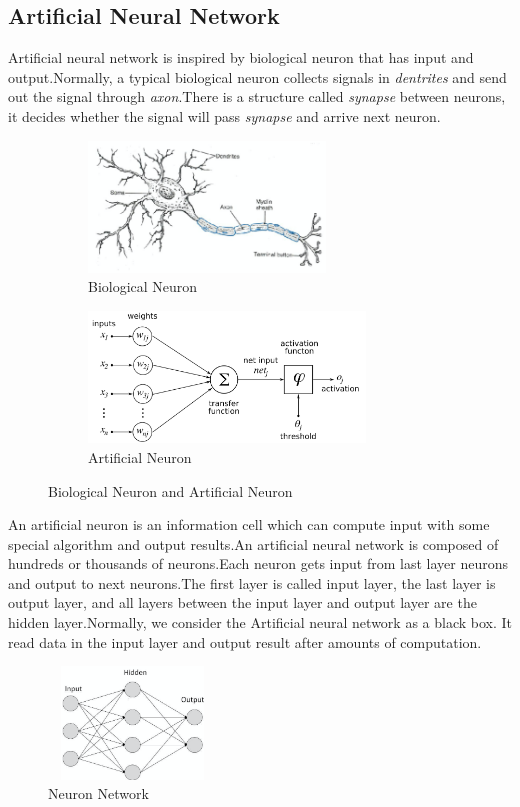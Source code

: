 \documentclass[12pt,a4paper]{report}
\begin{document}
\subsection{Artificial Neural Network}
Artificial neural network is inspired by biological neuron that has input and output.Normally, a typical biological neuron collects  signals in \textit{dentrites} and send out the signal through \textit{axon}.There is a structure called \textit{synapse} between neurons, it decides whether the signal will pass \textit{synapse} and arrive next neuron.
\begin{figure}[h]
\begin{subfigure}{0.5\linewidth}
	\includegraphics[height=3.5cm,width=\textwidth]{n1.png}
	\caption{Biological Neuron}
\end{subfigure}
\begin{subfigure}{0.5\linewidth}
	\includegraphics[height=3.5cm,width=\textwidth]{Aneuron.png}
	\caption{Artificial Neuron}
\end{subfigure}
\label{Biological Neuron and Artificial Neuron}
\caption{Biological Neuron and Artificial Neuron}
\end{figure}
An artificial neuron is an information cell which can compute input with some special algorithm and output results.An artificial neural network is composed of hundreds or thousands of neurons.Each neuron gets input from last layer neurons and output to next neurons.The first layer is called input layer, the last layer is output layer, and all layers between the input layer and output layer are the hidden layer.Normally, we consider the Artificial neural network as a black box. It read data in the input layer and output result after amounts of computation.\\

\begin{figure}[h]
\centering
\includegraphics[height=3cm,width=0.4\textwidth]{nn1.png}
\caption{Neuron Network}
\end{figure}
\end{document}
